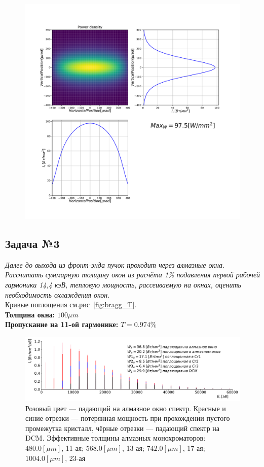 \documentclass[14pt,a4paper]{extarticle}
\numberwithin{equation}{section}
\begin{document}
\begin{figure}[htbp]
\begin{minipage}{1.\textwidth}
		\includegraphics[width=\textwidth]{pic/power_dens.pdf}
		\caption{}
		\label{fig:spec}
\end{minipage}     
\end{figure}

\subsection{Задача №3}
\textit{Далее до выхода из фронт-энда пучок проходит через алмазные окна. Рассчитать суммарную толщину окон из расчёта 1\% подавления первой рабочей гармоники 14,4 кэВ, тепловую мощность, рассеиваемую на окнах, оценить необходимость охлаждения окон.}\\
Кривые поглощения см.рис~\ref{fig:bragg_T}.\\
\textbf{Толщина окна:} $100\mu m$\\
\textbf{Пропускание на 11-ой гармонике:} $T = 0.974 \%$\\
\begin{figure}[htbp]
	\centering  
	\includegraphics[width=\textwidth]{pic/spec.pdf}
	\caption{Розовый цвет --- падающий на алмазное окно спектр. Красные и синие отрезки --- потерянная мощность при прохождении пустого промежутка кристалл, чёрные отрезки --- падающий спектр на DCM. Эффективные толщины алмазных монохроматоров: $480.0 [\mu m]$, 11-ая; $568.0 [\mu m]$, 13-ая; $742.0 [\mu m]$, 17-ая; $1004.0 [\mu m]$, 23-ая}
	\label{fig:absorb_spec}
	
\end{figure}
\end{document}
